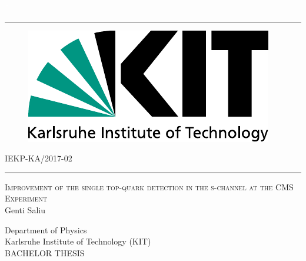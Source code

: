 \begin{titlepage}
  \begin{addmargin}[1.5cm]{0cm}
    \thispagestyle{empty}
    \vspace{-1cm}
    \begin{center}
                \textcolor{white}{´}\vspace{-3.5cm}
                  \rule{\linewidth}{0.75pt}
                    \vspace{-0.15cm}

\begin{figure}[htbp]
  \centering
  \hspace{26pt}
  \includegraphics[scale=0.5]{assets/LogoKit_en}
\end{figure}

      \vspace{-0.45cm}
\hspace{9cm}IEKP-KA/2017-02
\rule{\linewidth}{0.75pt}

\vspace{0.8cm}


\Large{\textsc{Improvement of the single top-quark detection in the s-channel at the CMS Experiment}}\\
\vspace{0.9cm}
\Large{Genti Saliu}\\
\vspace{0.9cm}
\vspace{1cm}
\large{Department of Physics\\
  
  Karlsruhe Institute of Technology (KIT)\\
  \vspace{0.825 cm}
  \large{BACHELOR THESIS}\\
  \vspace{0.825 cm}

}
\end{center}
\end{addmargin}
\end{titlepage}
